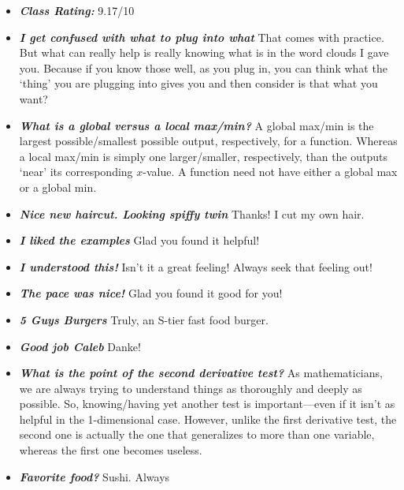 \documentclass[11pt,letterpaper]{article}
\begin{document}
\begin{itemize}
\item {\bfseries\itshape Class Rating:} 9.17/10

\item {\bfseries\itshape I get confused with what to plug into what} That comes with practice. But what can really help is really knowing what is in the word clouds I gave you. Because if you know those well, as you plug in, you can think what the `thing' you are plugging into gives you and then consider is that what you want?

\item {\bfseries\itshape What is a global versus a local max/min?} A global max/min is the largest possible/smallest possible output, respectively, for a function. Whereas a local max/min is simply one larger/smaller, respectively, than the outputs `near' its corresponding $x$-value. A function need not have either a global max or a global min.

\item {\bfseries\itshape Nice new haircut. Looking spiffy twin} Thanks! I cut my own hair.

\item {\bfseries\itshape I liked the examples} Glad you found it helpful!

\item {\bfseries\itshape I understood this!} Isn't it a great feeling! Always seek that feeling out!

\item {\bfseries\itshape The pace was nice!} Glad you found it good for you!

\item {\bfseries\itshape 5 Guys Burgers} Truly, an S-tier fast food burger. 

\item {\bfseries\itshape Good job Caleb} Danke!

\item {\bfseries\itshape What is the point of the second derivative test?} As mathematicians, we are always trying to understand things as thoroughly and deeply as possible. So, knowing/having yet another test is important---even if it isn't as helpful in the 1-dimensional case. However, unlike the first derivative test, the second one is actually the one that generalizes to more than one variable, whereas the first one becomes useless. 

\item {\bfseries\itshape Favorite food?} Sushi. Always


\end{itemize}
\end{document}
